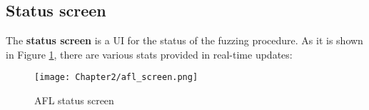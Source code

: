 
% 

\subsection{Status screen}

The \textbf{status screen} is a UI for the status of the fuzzing procedure. As it is shown in Figure \ref{fig:status_screen}, there are various stats provided in real-time updates:
    
\begin{figure}[!b]
    \texttt{[image: Chapter2/afl\_screen.png]}
    \centering
    \caption{AFL status screen}
    \label{fig:status_screen}
\end{figure} 

